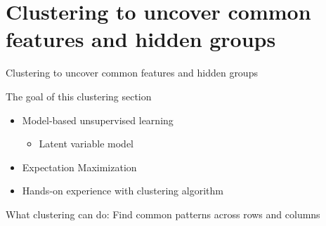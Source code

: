 \documentclass[
  ignorenonframetext,
  aspectratio=169]{beamer}
\providecommand{\tightlist}{%
  \setlength{\itemsep}{0pt}\setlength{\parskip}{0pt}}
\begin{document}
\hypertarget{clustering-to-uncover-common-features-and-hidden-groups}{%
\section{Clustering to uncover common features and hidden
groups}\label{clustering-to-uncover-common-features-and-hidden-groups}}

\begin{frame}{Clustering to uncover common features and hidden groups}
\scriptsize

\normalsize
\end{frame}

\begin{frame}{The goal of this clustering section}
\protect\hypertarget{the-goal-of-this-clustering-section}{}
\begin{itemize}
\item
  Model-based unsupervised learning

  \begin{itemize}
  \tightlist
  \item
    Latent variable model
  \end{itemize}
\item
  Expectation Maximization
\item
  Hands-on experience with clustering algorithm
\end{itemize}

\scriptsize

\normalsize
\end{frame}

\begin{frame}{What clustering can do: Find common patterns across rows
and columns}
\protect\hypertarget{what-clustering-can-do-find-common-patterns-across-rows-and-columns}{}
\scriptsize


\normalsize

\scriptsize


\normalsize
\end{frame}
\end{document}
